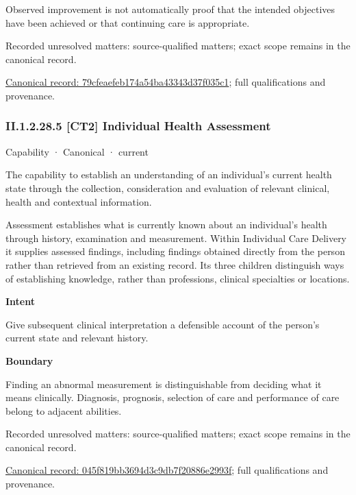 Observed improvement is not automatically proof that the intended objectives have been achieved or that continuing care is appropriate.


{\small Recorded unresolved matters: source-qualified matters; exact scope remains in the canonical record.}\par
{\footnotesize \href{../../../../continuum/strategy/capability/79cfeaefeb174a54ba43343d37f035c1.md}{Canonical record: 79cfeaefeb174a54ba43343d37f035c1}; full qualifications and provenance.}\par
\subsubsection*{II.1.2.28.5 [CT2] Individual Health Assessment}
\label{navigation:II.1.2.28.5}

\label{element:045f819bb3694d3c9db7f20886e2993f}
{\small Capability · Canonical · current}\par

The capability to establish an understanding of an individual's current health state through the collection, consideration and evaluation of relevant clinical, health and contextual information.



Assessment establishes what is currently known about an individual's health through history, examination and measurement. Within Individual Care Delivery it supplies assessed findings, including findings obtained directly from the person rather than retrieved from an existing record. Its three children distinguish ways of establishing knowledge, rather than professions, clinical specialties or locations.



\textbf{Intent}



Give subsequent clinical interpretation a defensible account of the person's current state and relevant history.



\textbf{Boundary}



Finding an abnormal measurement is distinguishable from deciding what it means clinically. Diagnosis, prognosis, selection of care and performance of care belong to adjacent abilities.


{\small Recorded unresolved matters: source-qualified matters; exact scope remains in the canonical record.}\par
{\footnotesize \href{../../../../continuum/strategy/capability/045f819bb3694d3c9db7f20886e2993f.md}{Canonical record: 045f819bb3694d3c9db7f20886e2993f}; full qualifications and provenance.}\par
